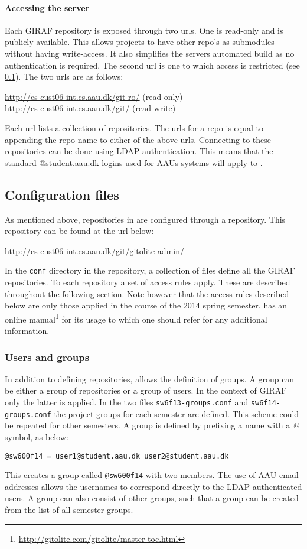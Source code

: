 \paragraph{Accessing the server}
Each GIRAF repository is exposed through two urls.
One is read-only and is publicly available.
This allows projects to have other repo's as submodules without having write-access.
It also simplifies the servers automated build as no authentication is required.
The second url is one to which access is restricted (see \cref{git:gitolite:config}).
The two urls are as follows:
\begin{center}
\url{http://cs-cust06-int.cs.aau.dk/git-ro/} (read-only)\\
\url{http://cs-cust06-int.cs.aau.dk/git/} (read-write)
\end{center}
Each url lists a collection of repositories.
The urls for a repo is equal to appending the repo name to either of the above urls.
Connecting to these repositories can be done using LDAP authentication.
This means that the standard @student.aau.dk logins used for AAUs systems will apply to \gitolite{}.

\subsection{Configuration files}\label{git:gitolite:config}
As mentioned above, repositories in \gitolite{} are configured through a \git{} repository.
This repository can be found at the url below:
\begin{center}
\url{http://cs-cust06-int.cs.aau.dk/git/gitolite-admin/}
\end{center}
In the \texttt{conf} directory in the repository, a collection of files define all the GIRAF repositories.
To each repository a set of access rules apply.
These are described throughout the following section.
Note however that the access rules described below are only those applied in the course of the 2014 spring semester.
\Gitolite{} has an online manual\footnote{\url{http://gitolite.com/gitolite/master-toc.html}} for its usage to which one should refer for any additional information.

\subsubsection{Users and groups}
In addition to defining repositories, \gitolite{} allows the definition of groups.
A group can be either a group of repositories or a group of users.
In the context of GIRAF only the latter is applied.
In the two files \texttt{sw6f13-groups.conf} and \texttt{sw6f14-groups.conf} the project groups for each semester are defined.
This scheme could be repeated for other semesters.
A group is defined by prefixing a name with a \textit{@} symbol, as below:
\begin{center}
\texttt{@sw600f14 = user1@student.aau.dk user2@student.aau.dk}
\end{center}
This creates a group called \texttt{@sw600f14} with two members.
The use of AAU email addresses allows the usernames to correspond directly to the LDAP authenticated users.
A group can also consist of other groups, such that a group can be created from the list of all semester groups.

